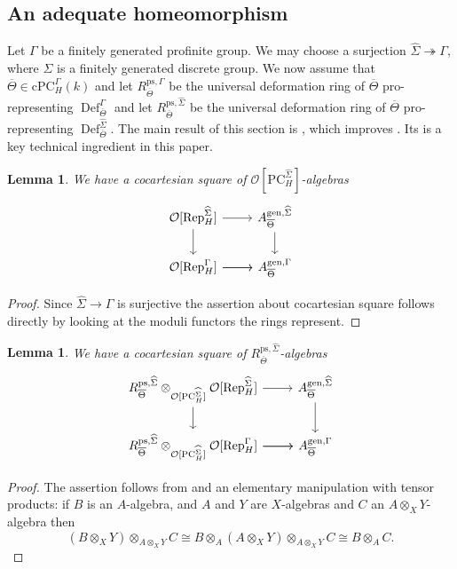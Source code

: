 \documentclass{amsart}
\newtheorem{lem}[prop]{Lemma}
\theoremstyle{definition}
\theoremstyle{remark}
\DeclareMathOperator{\Rep}{Rep}
\DeclareMathOperator{\Def}{Def}
\newcommand{\OO}{\mathcal O}
\newcommand{\gen}{\mathrm{gen}}
\newcommand{\PC}{\mathrm{PC}}
\newcommand{\cPC}{\mathrm{cPC}}
\newcommand{\Thetabar}{\overline{\Theta}}
\newcommand{\ps}{\mathrm{ps}}
\newcommand{\Sigmahat}{\widehat{\Sigma}}
\begin{document}
\subsection{An adequate homeomorphism} Let $\Gamma$ be a 
finitely generated profinite group. We may choose a surjection 
$\Sigmahat\twoheadrightarrow \Gamma$, where $\Sigma$ is a finitely generated discrete group. We now assume that $\Thetabar \in \cPC_H^{\Gamma}(k)$ and let $R^{\ps, \Gamma}_{\Thetabar}$
be  the universal deformation ring of $\Thetabar$ 
pro-representing $\Def^{\Gamma}_{\Thetabar}$ 
and let $R^{\ps, \Sigmahat}_{\Thetabar}$
be  the universal deformation ring of $\Thetabar$
pro-representing $\Def^{\Sigmahat}_{\Thetabar}$.
The main result of this section is , which improves \cite[Corollary 7.6]{defG}.
Its  
is  a key technical ingredient in this paper.



\begin{lem}\label{pushout_wins} 
We have a cocartesian square of $\OO[\PC^{\widehat \Sigma}_H]$-algebras
    \begin{equation}
        \begin{tikzcd}
            \OO[\Rep^{\widehat \Sigma}_H] \ar[r] \ar[d] & A^{\gen, \widehat \Sigma}_{\Thetabar} \ar[d] \\
            \OO[\Rep^{\Gamma}_H] \ar[r] \ar[r] & A^{\gen, \Gamma}_{\Thetabar}
        \end{tikzcd}
    \end{equation}
\end{lem}
\begin{proof}
    Since $\widehat \Sigma \to \Gamma$ is surjective the assertion about cocartesian square follows directly by looking at the moduli functors the rings represent.
\end{proof}

\begin{lem}\label{pullup_wins} 
We have a cocartesian square of $R^{\ps, \Sigmahat}_{\Thetabar}$-algebras
    \begin{equation}\label{eq_pull}
        \begin{tikzcd}
            R^{\ps, \Sigmahat}_{\Thetabar}\otimes_{\OO[\PC^{\Sigmahat}_H]}\OO[\Rep^{\widehat \Sigma}_H] \ar[r] \ar[d] & A^{\gen, \widehat \Sigma}_{\Thetabar} \ar[d] \\
            R^{\ps, \Sigmahat}_{\Thetabar}\otimes_{\OO[\PC^{\Sigmahat}_H]}\OO[\Rep^{\Gamma}_H] \ar[r] \ar[r] & A^{\gen, \Gamma}_{\Thetabar}
        \end{tikzcd}
    \end{equation}
\end{lem}
\begin{proof} The assertion follows from  
and an elementary manipulation with tensor products: if 
$B$ is an $A$-algebra, and $A$ and $Y$ are $X$-algebras and 
$C$ an $A\otimes_X Y$-algebra then 
$$ (B\otimes_X Y)\otimes_{A\otimes_X Y} C \cong 
B\otimes_A(A\otimes_X Y)\otimes_{A\otimes_X Y} C \cong B\otimes_A C.$$
\end{proof} 
\end{document}
